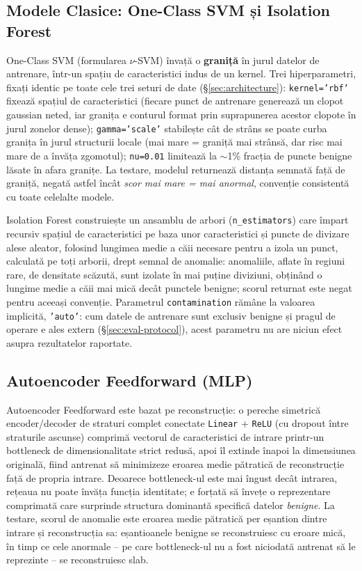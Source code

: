 \subsection{Modele Clasice: One-Class SVM și Isolation Forest}

One-Class SVM (formularea $\nu$-SVM) învață o \textbf{graniță} în jurul datelor de antrenare, într-un spațiu de caracteristici indus de un kernel. Trei hiperparametri, fixați identic pe toate cele trei seturi de date (\S\ref{sec:architecture}): \texttt{kernel='rbf'} fixează spațiul de caracteristici (fiecare punct de antrenare generează un clopot gaussian neted, iar granița e conturul format prin suprapunerea acestor clopote în jurul zonelor dense); \texttt{gamma='scale'} stabilește cât de strâns se poate curba granița în jurul structurii locale (mai mare = graniță mai strânsă, dar risc mai mare de a învăța zgomotul); \texttt{nu=0.01} limitează la $\sim$1\% fracția de puncte benigne lăsate în afara granițe. La testare, modelul returnează distanța semnată față de graniță, negată astfel încât \emph{scor mai mare = mai anormal}, convenție consistentă cu toate celelalte modele.

Isolation Forest construiește un ansamblu de arbori (\texttt{n\_estimators}) care împart recursiv spațiul de caracteristici pe baza unor caracteristici și puncte de divizare alese aleator, folosind lungimea medie a căii necesare pentru a izola un punct, calculată pe toți arborii, drept semnal de anomalie: anomaliile, aflate în regiuni rare, de densitate scăzută, sunt izolate în mai puține diviziuni, obținând o lungime medie a căii mai mică decât punctele benigne; scorul returnat este negat pentru aceeași convenție. Parametrul \texttt{contamination} rămâne la valoarea implicită, \texttt{'auto'}: cum datele de antrenare sunt exclusiv benigne și pragul de operare e ales extern (\S\ref{sec:eval-protocol}), acest parametru nu are niciun efect asupra rezultatelor raportate.

\subsection{Autoencoder Feedforward (MLP)}

Autoencoder Feedforward este bazat pe reconstrucție: o pereche simetrică encoder\slash decoder de straturi complet conectate \texttt{Linear} + \texttt{ReLU} (cu dropout între straturile ascunse) comprimă vectorul de caracteristici de intrare printr-un bottleneck de dimensionalitate strict redusă, apoi îl extinde înapoi la dimensiunea originală, fiind antrenat să minimizeze eroarea medie pătratică de reconstrucție față de propria intrare. Deoarece bottleneck-ul este mai îngust decât intrarea, rețeaua nu poate învăța funcția identitate; e forțată să învețe o reprezentare comprimată care surprinde structura dominantă specifică datelor \emph{benigne}.
La testare, scorul de anomalie este eroarea medie pătratică per eșantion dintre intrare și reconstrucția sa: eșantioanele benigne se reconstruiesc cu eroare mică, în timp ce cele anormale -- pe care bottleneck-ul nu a fost niciodată antrenat să le reprezinte -- se reconstruiesc slab.

